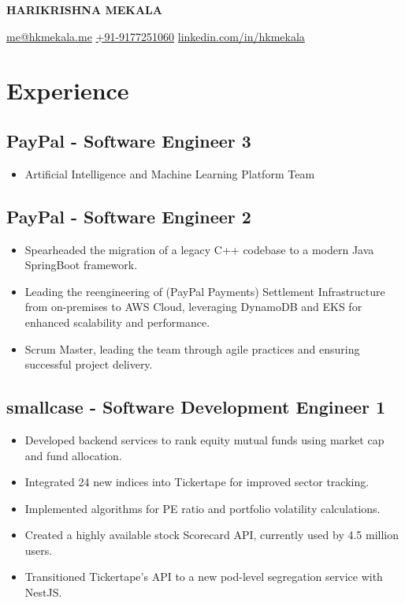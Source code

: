 \documentclass[11pt]{article}
\begin{document}
\begin{center}
  {\Huge\bfseries\uppercase{Harikrishna Mekala}} \\ \medskip

  \href{mailto:me@hkmekala.me}{me@hkmekala.me} \quad
  \href{tel:+919177251060}{+91-9177251060} \quad
  \href{https://www.linkedin.com/in/hkmekala}{linkedin.com/in/hkmekala}
\end{center}

\section{Experience}
\subsection{\textbf{PayPal} - Software Engineer 3  }
\begin{itemize}
	\item Artificial Intelligence and Machine Learning Platform Team
\end{itemize}
\subsection{\textbf{PayPal} - Software Engineer 2  }
\begin{itemize}
	\item Spearheaded the migration of a legacy C++ codebase to a modern Java SpringBoot framework.
	\item Leading the reengineering of (PayPal Payments) Settlement Infrastructure from on-premises to AWS Cloud, leveraging DynamoDB and EKS for enhanced scalability and performance.
    \item Scrum Master, leading the team through agile practices and ensuring successful project delivery.
\end{itemize}

\subsection{\textbf{smallcase} - Software Development Engineer 1  }
\begin{itemize}
    \item Developed backend services to rank equity mutual funds using market cap and fund allocation.
    \item Integrated 24 new indices into Tickertape for improved sector tracking.
    \item Implemented algorithms for PE ratio and portfolio volatility calculations.
    \item Created a highly available stock Scorecard API, currently used by 4.5 million users.
    \item Transitioned Tickertape’s API to a new pod-level segregation service with NestJS.
\end{itemize}
\end{document}
